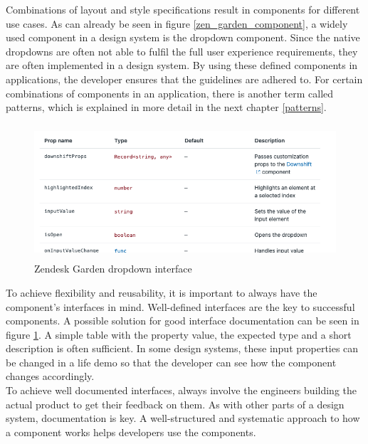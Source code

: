 Combinations of layout and style specifications result in components for different use cases. As can already be seen in figure \ref{zen_garden_component}, a widely used component in a design system is the dropdown component. Since the native dropdowns are often not able to fulfil the full user experience requirements, they are often implemented in a design system.  By using these defined components in applications, the developer ensures that the guidelines are adhered to. For certain combinations of components in an application, there is another term called patterns, which is explained in more detail in the next chapter \ref{patterns}. \\
\begin{figure}[hbtp]
	\centerline{\includegraphics[height=5cm]{images/zendesk_component_interface.png}}
	\caption{Zendesk Garden dropdown interface \cite{zendesk_garden_zendesk_nodate}}
	\label{zen_garden_interface}
\end{figure}
To achieve flexibility and reusability, it is important to always have the component's interfaces in mind. Well-defined interfaces are the key to successful components. A possible solution for good interface documentation can be seen in figure \ref{zen_garden_interface}. A simple table with the property value, the expected type and a short description is often sufficient. In some design systems, these input properties can be changed in a life demo so that the developer can see how the component changes accordingly.\\
To achieve well documented interfaces, always involve the engineers building the actual product to get their feedback on them. As with other parts of a design system, documentation is key. A well-structured and systematic approach to how a component works helps developers use the components.  \cite{vesselov_building_2019}

